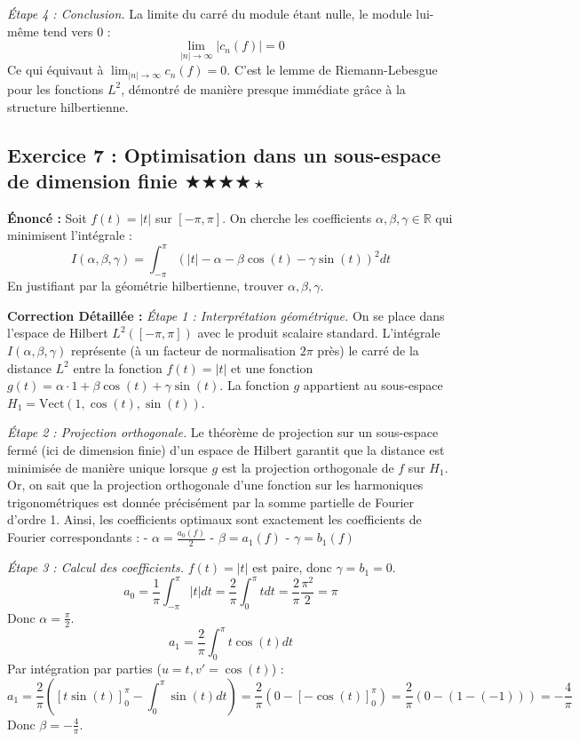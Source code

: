 \documentclass[11pt,a4paper]{article}
\begin{document}
\textit{Étape 4 : Conclusion.}
La limite du carré du module étant nulle, le module lui-même tend vers $0$ :
$$\lim_{|n| \to \infty} |c_n(f)| = 0$$
Ce qui équivaut à $\lim_{|n| \to \infty} c_n(f) = 0$.
C'est le lemme de Riemann-Lebesgue pour les fonctions $L^2$, démontré de manière presque immédiate grâce à la structure hilbertienne.

\vspace{1cm}
\subsection*{Exercice 7 : Optimisation dans un sous-espace de dimension finie $\bigstar\bigstar\bigstar\bigstar\star$}

\textbf{Énoncé :} Soit $f(t) = |t|$ sur $[-\pi, \pi]$.
On cherche les coefficients $\alpha, \beta, \gamma \in \mathbb{R}$ qui minimisent l'intégrale :
$$I(\alpha, \beta, \gamma) = \int_{-\pi}^\pi ( |t| - \alpha - \beta \cos(t) - \gamma \sin(t) )^2 dt$$
En justifiant par la géométrie hilbertienne, trouver $\alpha, \beta, \gamma$.

\textbf{Correction Détaillée :}
\textit{Étape 1 : Interprétation géométrique.}
On se place dans l'espace de Hilbert $L^2([-\pi, \pi])$ avec le produit scalaire standard.
L'intégrale $I(\alpha, \beta, \gamma)$ représente (à un facteur de normalisation $2\pi$ près) le carré de la distance $L^2$ entre la fonction $f(t) = |t|$ et une fonction $g(t) = \alpha \cdot 1 + \beta \cos(t) + \gamma \sin(t)$.
La fonction $g$ appartient au sous-espace $H_1 = \text{Vect}(1, \cos(t), \sin(t))$.

\textit{Étape 2 : Projection orthogonale.}
Le théorème de projection sur un sous-espace fermé (ici de dimension finie) d'un espace de Hilbert garantit que la distance est minimisée de manière unique lorsque $g$ est la projection orthogonale de $f$ sur $H_1$.
Or, on sait que la projection orthogonale d'une fonction sur les harmoniques trigonométriques est donnée précisément par la somme partielle de Fourier d'ordre 1.
Ainsi, les coefficients optimaux sont exactement les coefficients de Fourier correspondants :
- $\alpha = \frac{a_0(f)}{2}$
- $\beta = a_1(f)$
- $\gamma = b_1(f)$

\textit{Étape 3 : Calcul des coefficients.}
$f(t) = |t|$ est paire, donc $\gamma = b_1 = 0$.
$$a_0 = \frac{1}{\pi} \int_{-\pi}^\pi |t| dt = \frac{2}{\pi} \int_0^\pi t dt = \frac{2}{\pi} \frac{\pi^2}{2} = \pi$$
Donc $\alpha = \frac{\pi}{2}$.
$$a_1 = \frac{2}{\pi} \int_0^\pi t \cos(t) dt$$
Par intégration par parties ($u=t, v'=\cos(t)$) :
$$a_1 = \frac{2}{\pi} \left( [t \sin(t)]_0^\pi - \int_0^\pi \sin(t) dt \right) = \frac{2}{\pi} ( 0 - [-\cos(t)]_0^\pi ) = \frac{2}{\pi} ( 0 - (1 - (-1)) ) = -\frac{4}{\pi}$$
Donc $\beta = -\frac{4}{\pi}$.
\end{document}

